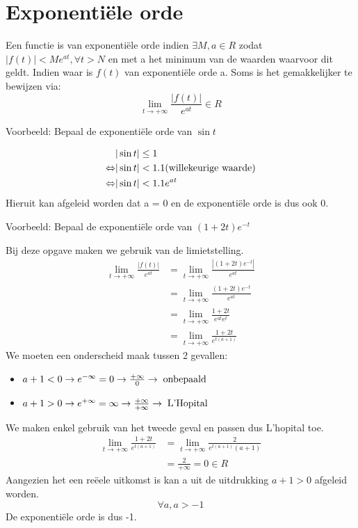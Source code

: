 \documentclass[12pt]{report}
\newcommand{\example}[2]{
      \hrulefill
      
      Voorbeeld: #1
      
      #2
      
      \hrulefill
}
\begin{document}
\section{Exponentiële orde}
Een functie is van exponentiële orde indien $\exists M, a \in R$ zodat $|f(t)| < Me^{at}, \forall t > N$ en met a het minimum van de waarden waarvoor dit geldt. Indien waar is $f(t)$ van exponentiële orde a.
Soms is het gemakkelijker te bewijzen via:
$$\lim_{t \to +\infty} \frac{|f(t)|}{e^{at}} \in R$$
\example{Bepaal de exponentiële orde van $\sin t$}{
\begin{equation*}
 \begin{split}
                   & |\sin t| \leq 1 \\
   \Leftrightarrow & |\sin t| < 1.1 \hbox{(willekeurige waarde)} \\
   \Leftrightarrow & |\sin t| < 1.1e^{at}
 \end{split}
\end{equation*}
Hieruit kan afgeleid worden dat a = 0 en de exponentiële orde is dus ook 0.
}
\example{Bepaal de exponentiële orde van $(1 + 2t)e^{-t}$}{
Bij deze opgave maken we gebruik van de limietstelling.
\begin{equation*}
 \begin{split}
  \lim_{t \to +\infty} \frac{|f(t)|}{e^{at}} & = \lim_{t \to +\infty} \frac{|(1 + 2t)e^{-t}|}{e^{at}} \\
                                             & = \lim_{t \to +\infty} \frac{(1 + 2t)e^{-t}}{e^{at}} \\
                                             & = \lim_{t \to +\infty} \frac{1 + 2t}{e^{at}e^{t}} \\
                                             & = \lim_{t \to +\infty} \frac{1 + 2t}{e^{t(a +1)}} 
 \end{split}
\end{equation*}
We moeten een onderscheid maak tussen 2 gevallen:
\begin{itemize}
 \item $a + 1 < 0 \rightarrow e^{-\infty} = 0 \rightarrow \frac{+\infty}{0} \rightarrow \; \hbox{onbepaald}$
 \item $a + 1 > 0 \rightarrow e^{+\infty} = \infty \rightarrow \frac{+\infty}{+\infty} \rightarrow \; \hbox{L'Hopital}$
\end{itemize}
We maken enkel gebruik van het tweede geval en passen dus L'hopital toe.
\begin{equation*}
 \begin{split}
  \lim_{t \to +\infty} \frac{1 + 2t}{e^{t(a +1)}} & = \lim_{t \to +\infty} \frac{2}{e^{t(a +1)}(a+1)} \\
                                                  & = \frac{2}{+\infty} = 0 \in R
 \end{split}
\end{equation*}
Aangezien het een reëele uitkomst is kan a uit de uitdrukking $a + 1 > 0$ afgeleid worden.
$$\forall a, a > -1$$
De exponentiële orde is dus -1.
}
\end{document}
